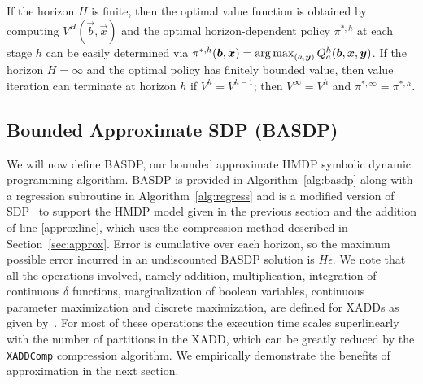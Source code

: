 If the horizon $H$ is finite, then the optimal value function is
obtained by computing $V^H(\vec{b},\vec{x})$ and the optimal
horizon-dependent policy $\pi^{*,h}$ at each stage $h$ can be easily
determined via $\pi^{*,h}(\vec{b},\vec{x}) = \argmax_{(a, \vec{y} )}
Q^h_a(\vec{b},\vec{x},\vec{y})$.  If the horizon $H = \infty$ and the
optimal policy has finitely bounded value, then value iteration can
terminate at horizon $h$ if $V^{h} = V^{h-1}$; then $V^\infty = V^h$
and $\pi^{*,\infty} = \pi^{*,h}$.

\subsection{Bounded Approximate SDP (BASDP)}

We will now define BASDP, our bounded approximate HMDP symbolic dynamic
programming algorithm.  BASDP is provided in Algorithm~\ref{alg:basdp}
along with a regression subroutine in Algorithm~\ref{alg:regress}
and is a modified version of SDP~\cite{zamani12} to support the HMDP
model given in the previous section and the addition of line \ref{approxline}, which
uses the compression method described in Section~\ref{sec:approx}. 
Error is cumulative over each horizon, so the maximum possible error
incurred in an undiscounted BASDP solution is $H\epsilon$.
We note that all the operations involved, namely addition,
multiplication, integration of continuous $\delta$ functions,
marginalization of boolean variables, continuous parameter
maximization and discrete maximization, are defined for XADDs as given
by~\cite{sanner_uai11,zamani12}.  For most of these operations the
execution time scales superlinearly with the number of partitions in
the XADD, which can be greatly reduced by the \texttt{XADDComp} compression
algorithm.  We empirically demonstrate the benefits of approximation
in the next section.
